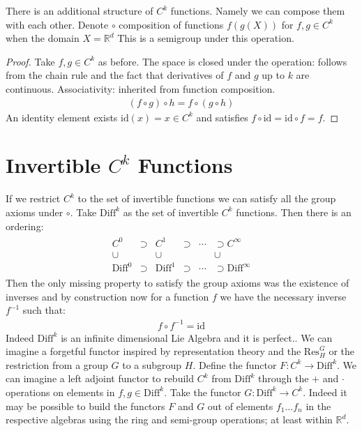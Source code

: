 \documentclass[10pt, oneside]{article}
\newcommand{\R}{\mathbb{R}}
\begin{document}
  There is an additional structure of $C^k$ functions. Namely we can compose them with each other. Denote $\circ$ composition of functions $f(g(X))$ for $f,g \in C^k$ when the domain $X=\R^d$
  This is a semigroup under this operation.
  \begin{proof}
     Take $f,g \in C^k$ as before. The space is closed under the operation: follows from the chain rule and the fact that derivatives of $f$ and $g$ up to $k$ are continuous.
     Associativity: inherited from function composition.
     \begin{align*}
        (f \circ g) \circ h = f \circ (g \circ h)
     \end{align*}
     An identity element exists $\text{id}(x) = x \in C^k$ and satisfies $f \circ \text{id} = \text{id} \circ f = f$.
  \end{proof}
\section*{Invertible $C^k$ Functions}
  If we restrict $C^k$ to the set of invertible functions we can satisfy all the group axioms under $\circ$.
  Take $\text{Diff}^k$ as the set of invertible $C^k$ functions. Then there is an ordering:
  \begin{align*}
     \begin{array}{cccccc}
        C^0 & \supset & C^1 & \supset & \cdots & \supset C^\infty \\
        \cup & & \cup & & & \cup \\
        \text{Diff}^0 & \supset & \text{Diff}^1 & \supset & \cdots & \supset \text{Diff}^\infty
\end{array}
  \end{align*}
  Then the only missing property to satisfy the group axioms was the existence of inverses and by construction now for a function $f$ we have the necessary inverse $f^{-1}$ such that:
  \begin{align*}
     f \circ f^{-1} = \text{id}
  \end{align*}
  Indeed $\text{Diff}^k$ is an infinite dimensional Lie Algebra and it is perfect.\cite{Banyaga1997}. We can imagine a forgetful functor inspired by representation theory and the $\text{Res}^G_H$ or the restriction from a group $G$ to a subgroup $H$.
  Define the functor $F: C^k \to \text{Diff}^k$. We can imagine a left adjoint functor to rebuild $C^k$ from $\text{Diff}^k$ through the $+$ and $\cdot$ operations on elements in $f,g \in \text{Diff}^k$. Take the functor $G: \text{Diff}^k \to C^k$.
  Indeed it may be possible to build the functors $F$ and $G$ out of elements $f_1 \dots f_n$ in the respective algebras using the ring and semi-group operations; at least within $\R^d$.
\end{document}
